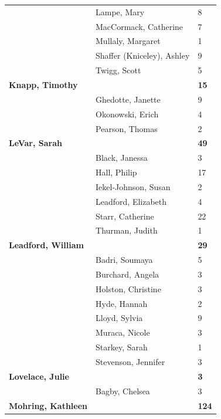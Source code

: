 \documentclass{article}\usepackage[]{graphicx}\usepackage[]{color}
\begin{document}
{\begin{longtable} { >{\raggedright}p{}|p{}p{}}
   \rowcolor[gray]{0.90} & Lampe, Mary & 8 \\ 
   \rowcolor[gray]{0.90} & MacCormack, Catherine & 7 \\ 
   \rowcolor[gray]{0.90} & Mullaly, Margaret & 1 \\ 
   & Shaffer (Kniceley), Ashley & 9 \\ 
   & Twigg, Scott & 5 \\ 
  \textbf{Knapp, Timothy} &  & \hspace{2cm}\textbf{15} \\ 
   \rowcolor[gray]{0.90} & Ghedotte, Janette & 9 \\ 
   \rowcolor[gray]{0.90} & Okonowski, Erich & 4 \\ 
   \rowcolor[gray]{0.90} & Pearson, Thomas & 2 \\ 
  \textbf{LeVar, Sarah} &  & \hspace{2cm}\textbf{49} \\ 
   & Black, Janessa & 3 \\ 
   & Hall, Philip & 17 \\ 
   \rowcolor[gray]{0.90} & Iekel-Johnson, Susan & 2 \\ 
   \rowcolor[gray]{0.90} & Leadford, Elizabeth & 4 \\ 
   \rowcolor[gray]{0.90} & Starr, Catherine & 22 \\ 
   & Thurman, Judith & 1 \\ 
  \textbf{Leadford, William} &  & \hspace{2cm}\textbf{29} \\ 
   & Badri, Soumaya & 5 \\ 
   \rowcolor[gray]{0.90} & Burchard, Angela & 3 \\ 
   \rowcolor[gray]{0.90} & Holston, Christine & 3 \\ 
   \rowcolor[gray]{0.90} & Hyde, Hannah & 2 \\ 
   & Lloyd, Sylvia & 9 \\ 
   & Muraca, Nicole & 3 \\ 
   & Starkey, Sarah & 1 \\ 
   \rowcolor[gray]{0.90} & Stevenson, Jennifer & 3 \\ 
   \rowcolor[gray]{0.90}\textbf{Lovelace, Julie} &  & \hspace{2cm}\textbf{3} \\ 
   \rowcolor[gray]{0.90} & Bagby, Chelsea & 3 \\ 
  \textbf{Mohring, Kathleen} &  & \hspace{2cm}\textbf{124} \\ 

\end{longtable}}
\end{document}
